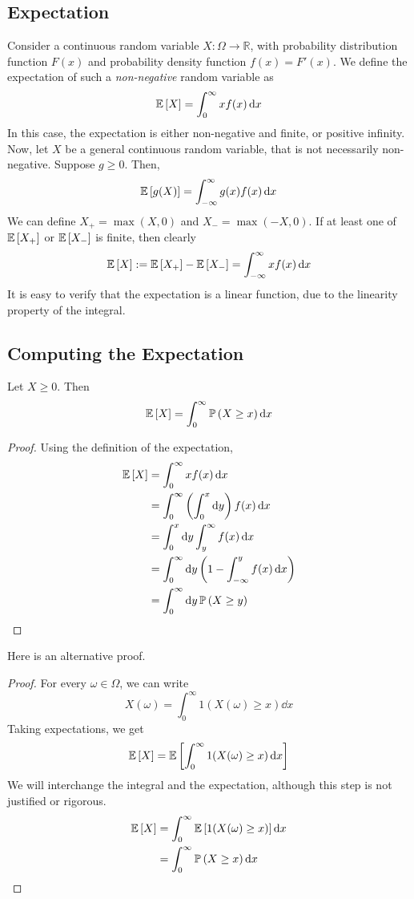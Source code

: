 \subsection{Expectation}
Consider a continuous random variable \(X \colon \Omega \to \mathbb R\), with probability distribution function \(F(x)\) and probability density function \(f(x) = F'(x)\).
We define the expectation of such a \textit{non-negative} random variable as
\[
	\mathbb{E}\left[{X}\right] = \int_0^\infty x f(x) \dd{x}
\]
In this case, the expectation is either non-negative and finite, or positive infinity.
Now, let \(X\) be a general continuous random variable, that is not necessarily non-negative.
Suppose \(g \geq 0\).
Then,
\[
	\mathbb{E}\left[{g(X)}\right] = \int_{-\infty}^\infty g(x) f(x) \dd{x}
\]
We can define \(X_+ = \max(X, 0)\) and \(X_- = \max(-X, 0)\).
If at least one of \(\mathbb{E}\left[{X_+}\right]\) or \(\mathbb{E}\left[{X_-}\right]\) is finite, then clearly
\[
	\mathbb{E}\left[{X}\right] := \mathbb{E}\left[{X_+}\right] - \mathbb{E}\left[{X_-}\right] = \int_{-\infty}^\infty xf(x) \dd{x}
\]
It is easy to verify that the expectation is a linear function, due to the linearity property of the integral.

\subsection{Computing the Expectation}
\begin{claim}
	Let \(X \geq 0\).
	Then
	\[
		\mathbb{E}\left[{X}\right] = \int_0^\infty \mathbb{P}\left({X \geq x}\right) \dd{x}
	\]
\end{claim}
\begin{proof}
	Using the definition of the expectation,
	\begin{align*}
		\mathbb{E}\left[{X}\right] & = \int_0^\infty xf(x) \dd{x}                                           \\
		           & = \int_0^\infty \left( \int_0^x \dd{y} \right) f(x) \dd{x}             \\
		           & = \int_0^x \dd{y} \int_y^\infty f(x) \dd{x}                            \\
		           & = \int_0^\infty \dd{y} \left( 1 - \int_{-\infty}^y f(x) \dd{x} \right) \\
		           & = \int_0^\infty \dd{y} \mathbb{P}\left({X \geq y}\right)
	\end{align*}
\end{proof}
\noindent Here is an alternative proof.
\begin{proof}
	For every \(\omega \in \Omega\), we can write
	\[
		X(\omega) = \int_0^\infty 1(X(\omega) \geq x) \dd{x}
	\]
	Taking expectations, we get
	\[
		\mathbb{E}\left[{X}\right] = \mathbb{E}\left[{\int_0^\infty 1(X(\omega) \geq x) \dd{x}}\right]
	\]
	We will interchange the integral and the expectation, although this step is not justified or rigorous.
	\begin{align*}
		\mathbb{E}\left[{X}\right] & = \int_0^\infty \mathbb{E}\left[{1(X(\omega) \geq x)}\right] \dd{x} \\
		           & = \int_0^\infty \mathbb{P}\left({X \geq x}\right) \dd{x}
	\end{align*}
\end{proof}


